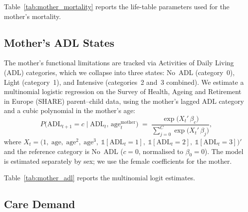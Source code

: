 Table~\ref{tab:mother_mortality} reports the life-table parameters used
for the mother's mortality.

\begin{table}[htbp]
\centering
\caption{Mother's Mortality --- Life-Table Parameters}
\label{tab:mother_mortality}

\end{table}


\subsection{Mother's ADL States}
\label{sec:mother_adl}

The mother's functional limitations are tracked via Activities of Daily
Living (ADL) categories, which we collapse into three states: No~ADL
(category~0), Light (category~1), and Intensive (categories~2 and~3
combined).  We estimate a multinomial logistic regression on the Survey of
Health, Ageing and Retirement in Europe (SHARE) parent--child data, using
the mother's lagged ADL category and a cubic polynomial in the mother's
age:
\begin{equation}
  P\!\bigl(\text{ADL}_{t+1} = c \mid \text{ADL}_{t},\,\text{age}^{\text{mother}}_t\bigr)
  \;=\;
  \frac{\exp\!\bigl(X_t'\,\beta_c\bigr)}
       {\sum_{j=0}^{C}\exp\!\bigl(X_t'\,\beta_j\bigr)},
  \label{eq:adl_multinomial}
\end{equation}
where $X_t = \bigl(1,\;\text{age},\;\text{age}^2,\;\text{age}^3,\;
\mathbb{1}[\text{ADL}_t = 1],\;\mathbb{1}[\text{ADL}_t = 2],\;
\mathbb{1}[\text{ADL}_t = 3]\bigr)'$
and the reference category is No~ADL ($c = 0$, normalised to
$\beta_0 = 0$).  The model is estimated separately by sex; we use the
female coefficients for the mother.

Table~\ref{tab:mother_adl} reports the multinomial logit estimates.

\begin{table}[htbp]
\centering
\caption{Mother's ADL Transition --- Multinomial Logit Parameters}
\label{tab:mother_adl}

\end{table}


\subsection{Care Demand}
\label{sec:care_demand}

